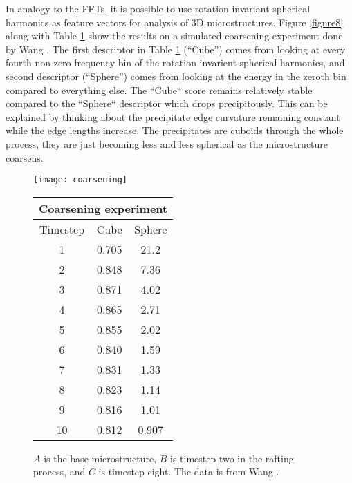 \documentclass[review]{elsarticle}
\begin{document}
	In analogy to the FFTs, it is possible to use rotation invariant spherical harmonics \cite{spherical} as feature vectors for analysis of 3D microstructures. Figure \ref{figure8} along with Table \ref{table3} show the results on a simulated coarsening experiment done by Wang \cite{ywang2}. The first descriptor in Table \ref{table3} (``Cube'') comes from looking at every fourth non-zero frequency bin of the rotation invarient spherical harmonics, and second descriptor (``Sphere'') comes from looking at the energy in the zeroth bin compared to everything else. The ``Cube`` score remains relatively stable compared to the ``Sphere`` descriptor which drops precipitously. This can be explained by thinking about the precipitate edge curvature remaining constant while the edge lengths increase. The precipitates are cuboids through the whole process, they are just becoming less and less spherical as the microstructure coarsens.
	
	\begin{figure}[!ht]
    	\begin{center}
			\texttt{[image: coarsening]}
	  		\caption{ $A$ is the base microstructure, $B$ is timestep two in the rafting process, and $C$ is timestep eight. The data is from Wang \cite{ywang2}. }
	  		\label{figure8}
  		
			\begin{tabular}{ c | c | c }
				\multicolumn{3}{c}{Coarsening experiment} \\
				\hline
				Timestep & Cube & Sphere \\
				\hline
				1 & 0.705 & 21.2 \\
				2 & 0.848 & 7.36 \\
				3 & 0.871 & 4.02 \\
				4 & 0.865 & 2.71 \\
				5 & 0.855 & 2.02 \\
				6 & 0.840 & 1.59 \\
				7 & 0.831 & 1.33 \\
				8 & 0.823 & 1.14 \\
				9 & 0.816 & 1.01 \\
				10 & 0.812 & 0.907 \\
				\hline
			\end{tabular}
			\label{table3}
		\end{center}
	\end{figure}
	
\end{document}
